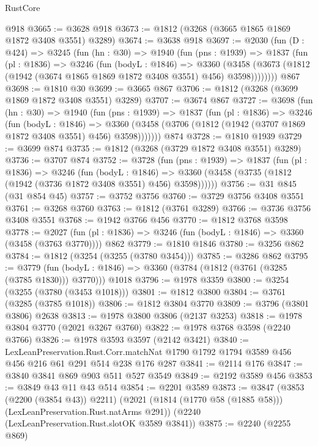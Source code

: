 \begin{lexlean}{RustCore}
\begin{coremodule}
    @918
@3665 := @3628 @918
@3673 := @1812 (@3268 (@3665 @1865 @1869 @1872 @3408 @3551) @3289)
@3674 := @3638 @918
@3697 := @2030
    (fun (D : @424) =>
    @3245
      (fun (hn : @30) =>
      @1940
        (fun (pns : @1939) =>
        @1837
          (fun (pl : @1836) =>
          @3246
            (fun (bodyL : @1846) =>
            @3360
              (@3458 (@3673 (@1812 (@1942 (@3674 @1865 @1869 @1872 @3408 @3551) @456) @3598))))))))
    @867
@3698 := @1810 @30
@3699 := @3665 @867
@3706 := @1812 (@3268 (@3699 @1869 @1872 @3408 @3551) @3289)
@3707 := @3674 @867
@3727 := @3698
    (fun (hn : @30) =>
    @1940
      (fun (pns : @1939) =>
      @1837
        (fun (pl : @1836) =>
        @3246
          (fun (bodyL : @1846) =>
          @3360 (@3458 (@3706 (@1812 (@1942 (@3707 @1869 @1872 @3408 @3551) @456) @3598)))))))
    @874
@3728 := @1810 @1939
@3729 := @3699 @874
@3735 := @1812 (@3268 (@3729 @1872 @3408 @3551) @3289)
@3736 := @3707 @874
@3752 := @3728
    (fun (pns : @1939) =>
    @1837
      (fun (pl : @1836) =>
      @3246
        (fun (bodyL : @1846) =>
        @3360 (@3458 (@3735 (@1812 (@1942 (@3736 @1872 @3408 @3551) @456) @3598))))))
@3756 := @31 @845 (@31 @854 @45)
@3757 := @3752 @3756
@3760 := @3729 @3756 @3408 @3551
@3761 := @3268 @3760
@3763 := @1812 (@3761 @3289)
@3766 := @3736 @3756 @3408 @3551
@3768 := @1942 @3766 @456
@3770 := @1812 @3768 @3598
@3778 := @2027 (fun (pl : @1836) => @3246 (fun (bodyL : @1846) => @3360 (@3458 (@3763 @3770)))) @862
@3779 := @1810 @1846
@3780 := @3256 @862
@3784 := @1812 (@3254 (@3255 (@3780 @3454)))
@3785 := @3286 @862
@3795 := @3779
    (fun (bodyL : @1846) => @3360 (@3784 (@1812 (@3761 (@3285 (@3785 @1830))) @3770)))
    @1018
@3796 := @1978 @3359
@3800 := @3254 (@3255 (@3780 (@3453 @1018)))
@3801 := @1812 @3800
@3804 := @3761 (@3285 (@3785 @1018))
@3806 := @1812 @3804 @3770
@3809 := @3796 (@3801 @3806) @2638
@3813 := @1978 @3800 @3806 (@2137 @3253)
@3818 := @1978 @3804 @3770 (@2021 @3267 @3760)
@3822 := @1978 @3768 @3598 (@2240 @3766)
@3826 := @1978 @3593 @3597 (@2142 @3421)
@3840 := LexLeanPreservation.Rust.Corr.matchNat
    @1790
    @1792
    @1794
    @3589
    @456
    @456
    @216
    @61
    @291
    @514
    @238
    @176
    @287
@3841 := @2114 @176
@3847 := @3840 @3841 @869 @903 @511 @527 @3549
@3849 := @2192 @3589 @456
@3853 := @3849 @43 @11 @43 @514
@3854 := @2201 @3589
@3873 := @3847
    (@3853 (@2200 (@3854 @43)) @2211)
    (@2021 (@1814 (@1770 @58 (@1885 @58))) (LexLeanPreservation.Rust.natArms @291))
    (@2240 (LexLeanPreservation.Rust.slotOK @3589 @3841))
@3875 := @2240 (@2255 @869)

\end{coremodule}
\end{lexlean}
